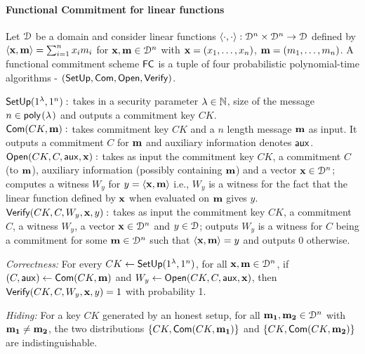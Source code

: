 \paragraph*{Functional Commitment for linear functions}
Let $\mathcal{D}$ be a domain and consider linear functions $\langle \cdot,\cdot\rangle : \mathcal{D}^n \times \mathcal{D}^n \rightarrow \mathcal{D}$ defined by $\langle {\bf x},{\bf m}\rangle = \sum_{i=1}^n x_im_i$ for ${\bf x, m} \in  \mathcal{D}^n$ with ${\bf x} = (x_1, \ldots , x_n)$, ${\bf m} = (m_1, \ldots, m_n)$. 
A functional commitment scheme $\mathsf{FC}$ is a tuple of four probabilistic polynomial-time algorithms - $(\mathsf{SetUp}, \mathsf{Com}, \mathsf{Open}, \mathsf{Verify})$.

\noindent$\mathsf{SetUp}(1^{\lambda}, 1^n):$ takes in a security parameter ${\lambda} \in \mathbb{N}$, size of the message $n \in \poly$ and outputs a commitment key $CK$.\\
\noindent$\mathsf{Com}(CK, {\bf m}):$ takes commitment key $CK$ and a $n$ length message ${\bf m}$ as input. It outputs a commitment $C$ for ${\bf m}$ and auxiliary information denotes $\mathsf{aux}$.\\
\noindent$\mathsf{Open}(CK, C, \mathsf{aux}, {\bf x}):$ takes as input the commitment key $CK$, a commitment $C$ (to ${\bf m}$), auxiliary information (possibly containing ${\bf m}$) and a vector ${\bf x} \in \mathcal{D}^n$; computes a witness
$W_y$ for $y = \langle {\bf x},{\bf m}\rangle$ i.e., $W_y$ is a witness for the fact that the linear function defined by ${\bf x}$ when evaluated on ${\bf m}$ gives $y$.\\
\noindent$\mathsf{Verify}(CK, C, W_y, {\bf x}, y):$ takes as input the commitment key $CK$, a commitment $C$, a witness $W_y$, a vector ${\bf x} \in \mathcal{D}^n$ and $y \in \mathcal{D}$; outputs $W_y$ is a witness for $C$ being a
commitment for some ${\bf m} \in \mathcal{D}^n$ such that $\langle {\bf x},{\bf m}\rangle = y$ and outputs $0$ otherwise.

{\it Correctness: } For every $CK \leftarrow \mathsf{SetUp}(1^{\lambda}, 1^n)$, for all ${\bf x, m} \in \mathcal{D}^n$, if $(C, \mathsf{aux}) \leftarrow \mathsf{Com}(CK, {\bf m})$ and $W_y \leftarrow \mathsf{Open}(CK, C, \mathsf{aux}, {\bf x})$, then $\mathsf{Verify}(CK, C, W_y, {\bf x}, y) = 1$ with probability 1.


{\it Hiding: } For a key $CK$ generated by an honest setup, for all ${\bf m_1, m_2} \in \mathcal{D}^n$ with ${\bf m_1} \neq {\bf m_2}$, the two distributions $\{CK, \mathsf{Com}(CK, {\bf m_1})\}$ and $\{CK, \mathsf{Com}(CK, {\bf m_2})\}$ are indistinguishable.

